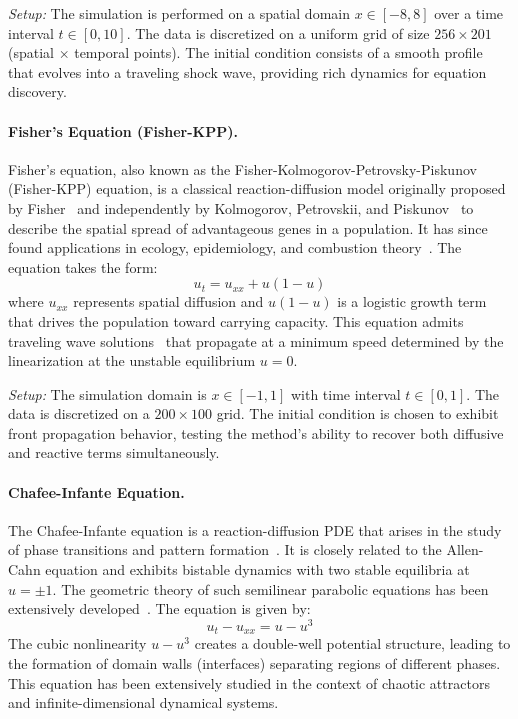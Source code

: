 \documentclass[twoside,11pt]{article}
\let\cite\citep
\newcommand{\1}{{\bf 1}}
\newcommand{\0}{{\bf 0}}
\begin{document}
\textit{Setup:} The simulation is performed on a spatial domain $x \in [-8, 8]$ over a time interval $t \in [0, 10]$. The data is discretized on a uniform grid of size $256 \times 201$ (spatial $\times$ temporal points). The initial condition consists of a smooth profile that evolves into a traveling shock wave, providing rich dynamics for equation discovery.

\paragraph{Fisher's Equation (Fisher-KPP).} 
Fisher's equation, also known as the Fisher-Kolmogorov-Petrovsky-Piskunov (Fisher-KPP) equation, is a classical reaction-diffusion model originally proposed by Fisher~\cite{fisher1937wave} and independently by Kolmogorov, Petrovskii, and Piskunov~\cite{kolmogorov1937study} to describe the spatial spread of advantageous genes in a population. It has since found applications in ecology, epidemiology, and combustion theory~\cite{murray1989mathematical}. The equation takes the form:
\begin{equation}
    u_t = u_{xx} + u(1-u)
\end{equation}
where $u_{xx}$ represents spatial diffusion and $u(1-u)$ is a logistic growth term that drives the population toward carrying capacity. This equation admits traveling wave solutions~\cite{ablowitz1979explicit} that propagate at a minimum speed determined by the linearization at the unstable equilibrium $u=0$.

\textit{Setup:} The simulation domain is $x \in [-1, 1]$ with time interval $t \in [0, 1]$. The data is discretized on a $200 \times 100$ grid. The initial condition is chosen to exhibit front propagation behavior, testing the method's ability to recover both diffusive and reactive terms simultaneously.

\paragraph{Chafee-Infante Equation.} 
The Chafee-Infante equation is a reaction-diffusion PDE that arises in the study of phase transitions and pattern formation~\cite{chafee1974bifurcation}. It is closely related to the Allen-Cahn equation and exhibits bistable dynamics with two stable equilibria at $u = \pm 1$. The geometric theory of such semilinear parabolic equations has been extensively developed~\cite{henry1981geometric}. The equation is given by:
\begin{equation}
    u_t - u_{xx} = u - u^3
\end{equation}
The cubic nonlinearity $u - u^3$ creates a double-well potential structure, leading to the formation of domain walls (interfaces) separating regions of different phases. This equation has been extensively studied in the context of chaotic attractors and infinite-dimensional dynamical systems.
\end{document}
